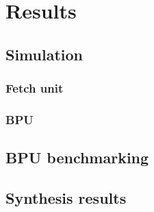 \chapter{Results}

\section{Simulation}

\subsection{Fetch unit}

\subsection{BPU}

\section{BPU benchmarking}

\section{Synthesis results}